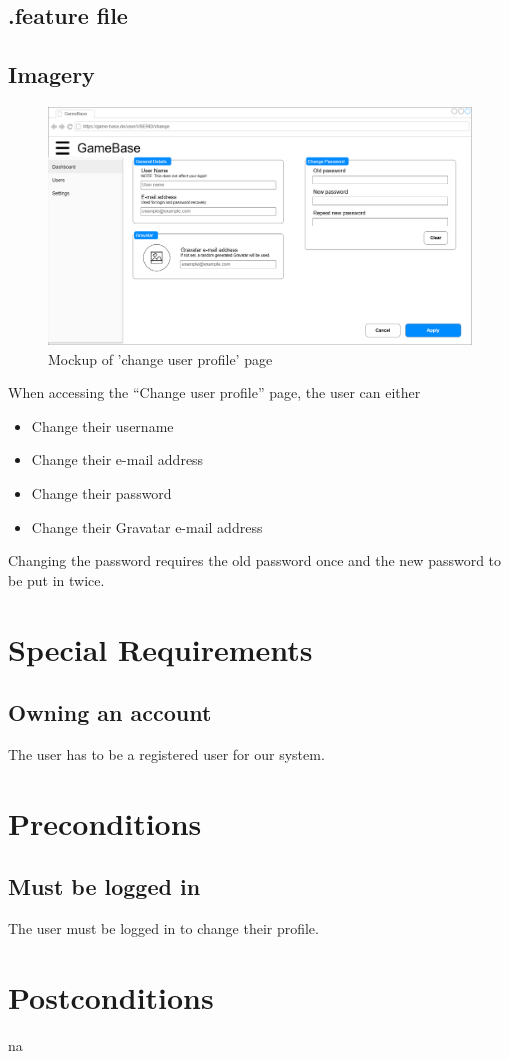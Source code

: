\documentclass[a4paper,12pt,chapterprefix=false,bibliography=totoc,listof=totoc,book]{scrreprt}
\begin{document}
    \section{.feature file}
    \begin{minipage}{\textwidth}
    
    \end{minipage}

    \section{Imagery}
    \begin{figure}[H]
        \includegraphics[]{diagramms/UCChangeUserProfileMockup.png}
        \caption{Mockup of 'change user profile' page}
        \label{fig:mockup}
    \end{figure}
    When accessing the \enquote{Change user profile} page, the user can either
    \begin{itemize}
        \item Change their username
        \item Change their e-mail address
        \item Change their password
        \item Change their Gravatar e-mail address
    \end{itemize}
    Changing the password requires the old password once and the new password to be put in twice.

    \chapter{Special Requirements}
    \section{Owning an account}
    The user has to be a registered user for our system.

    \chapter{Preconditions}
    \section{Must be logged in}
    The user must be logged in to change their profile.

    \chapter{Postconditions}
    \gls{na}
\end{document}
